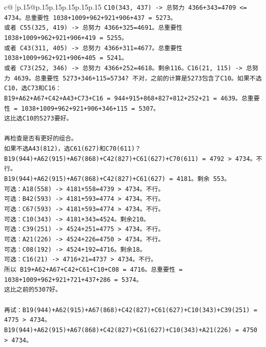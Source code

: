 \documentclass{article}
\begin{document}
{\begin{supertabular}{c@{$\;$}|p{.15\linewidth}@{}p{.15\linewidth}p{.15\linewidth}p{.15\linewidth}p{.15\linewidth}p{.15\linewidth}}
{{{\texttt{C10(343, 437) {-}> 总努力 4366+343=4709 <= 4734。总重要性 1038+1009+962+921+906+437 = 5273。} \\
\texttt{或者 C55(325, 419) {-}> 总努力 4366+325=4691。总重要性 1038+1009+962+921+906+419 = 5255。} \\
\texttt{或者 C43(311, 405) {-}> 总努力 4366+311=4677。总重要性 1038+1009+962+921+906+405 = 5241。} \\
\texttt{或者 C73(252, 346) {-}> 总努力 4366+252=4618。剩余116。C16(21, 115) {-}> 总努力 4639。总重要性 5273+346+115=5734? 不对，之前的计算是5273包含了C10。如果不选C10，选C73和C16：} \\
\texttt{B19+A62+A67+C42+A43+C73+C16 = 944+915+868+827+812+252+21 = 4639。总重要性 = 1038+1009+962+921+906+346+115 = 5307。} \\
\texttt{这比选C10的5273要好。} \\
\\ 
\texttt{再检查是否有更好的组合。} \\
\texttt{如果不选A43(812)，选C61(627)和C70(611)？} \\
\texttt{B19(944)+A62(915)+A67(868)+C42(827)+C61(627)+C70(611) = 4792 > 4734。不行。} \\
\texttt{B19(944)+A62(915)+A67(868)+C42(827)+C61(627) = 4181。剩余 553。} \\
\texttt{可选：A18(558) {-}> 4181+558=4739 > 4734。不行。} \\
\texttt{可选：B42(593) {-}> 4181+593=4774 > 4734。不行。} \\
\texttt{可选：C67(593) {-}> 4181+593=4774 > 4734。不行。} \\
\texttt{可选：C10(343) {-}> 4181+343=4524。剩余210。} \\
\texttt{可选：C39(251) {-}> 4524+251=4775 > 4734。不行。} \\
\texttt{可选：A21(226) {-}> 4524+226=4750 > 4734。不行。} \\
\texttt{可选：C08(192) {-}> 4524+192=4716。剩余18。} \\
\texttt{可选：C16(21) {-}> 4716+21=4737 > 4734。不行。} \\
\texttt{所以 B19+A62+A67+C42+C61+C10+C08 = 4716。总重要性 = 1038+1009+962+921+721+437+286 = 5374。} \\
\texttt{这比之前的5307好。} \\
\\ 
\texttt{再试：B19(944)+A62(915)+A67(868)+C42(827)+C61(627)+C10(343)+C39(251) = 4775 > 4734。} \\
\texttt{B19(944)+A62(915)+A67(868)+C42(827)+C61(627)+C10(343)+A21(226) = 4750 > 4734。} \\
}}}
\end{supertabular}}
\end{document}
